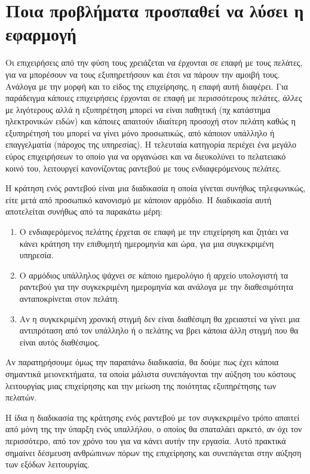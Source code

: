 \section {Ποια προβλήματα προσπαθεί να λύσει η εφαρμογή}
Οι επιχειρήσεις από την φύση τους χρειάζεται να έρχονται σε επαφή με τους πελάτες, για να μπορέσουν να τους εξυπηρετήσουν και έτσι να πάρουν την αμοιβή τους. Ανάλογα με την μορφή και το είδος της επιχείρησης, η επαφή αυτή διαφέρει. Για παράδειγμα κάποιες επιχειρήσεις έρχονται σε επαφή με περισσότερους πελάτες, άλλες με λιγότερους αλλά η εξυπηρέτηση μπορεί να είναι παθητική (πχ κατάστημα ηλεκτρονικών ειδών) και κάποιες απαιτούν ιδιαίτερη προσοχή στον πελάτη καθώς η εξυπηρέτησή του μπορεί να γίνει μόνο προσωπικώς, από κάποιον υπάλληλο ή επαγγελματία (πάροχος της υπηρεσίας). Η τελευταία κατηγορία περιέχει ένα μεγάλο εύρος επιχειρήσεων το οποίο για να οργανώσει και να διευκολύνει το πελατειακό κοινό του, λειτουργεί κανονίζοντας ραντεβού με τους ενδιαφερόμενους πελάτες.

Η κράτηση ενός ραντεβού είναι μια διαδικασία η οποία γίνεται συνήθως τηλεφωνικώς, είτε μετά από προσωπικό κανονισμό με κάποιον αρμόδιο. Η διαδικασία αυτή αποτελείται συνήθως από τα παρακάτω μέρη:  
\begin{enumerate}
\item Ο ενδιαφερόμενος πελάτης έρχεται σε επαφή με την επιχείρηση και ζητάει να κάνει κράτηση την επιθυμητή ημερομηνία και ώρα, για μια συγκεκριμένη υπηρεσία. 
\item Ο αρμόδιος υπάλληλος ψάχνει σε κάποιο ημερολόγιο ή αρχείο υπολογιστή τα ραντεβού για την συγκεκριμένη ημερομηνία και ανάλογα με την διαθεσιμότητα ανταποκρίνεται στον πελάτη.
\item Αν η συγκεκριμένη χρονική στιγμή δεν είναι διαθέσιμη θα χρειαστεί να γίνει μια αντιπρόταση από τον υπάλληλο ή ο πελάτης να βρει κάποια άλλη στιγμή που θα είναι αυτός διαθέσιμος.
\end{enumerate} 
Αν παρατηρήσουμε όμως την παραπάνω διαδικασία, θα δούμε πως έχει κάποια σημαντικά μειονεκτήματα, τα οποία μάλιστα συνεπάγονται την αύξηση του κόστους λειτουργίας μιας επιχείρησης και την μείωση της ποιότητας εξυπηρέτησης των πελατών. 

Η  ίδια η διαδικασία της κράτησης ενός ραντεβού με τον συγκεκριμένο τρόπο απαιτεί από μόνη της την ύπαρξη ενός υπαλλήλου, ο οποίος θα σπαταλάει αρκετό, αν όχι τον περισσότερο, από τον χρόνο του για να κάνει αυτήν την εργασία. Αυτό πρακτικά σημαίνει δέσμευση ανθρώπινων πόρων της επιχείρησης και συνεπάγεται στην αύξηση των εξόδων λειτουργίας. 

